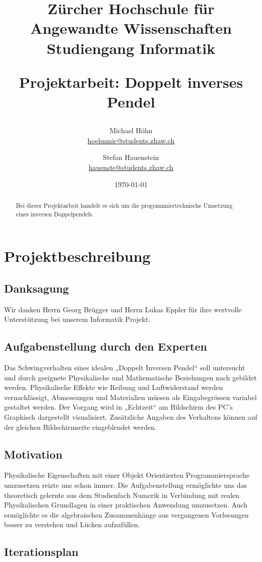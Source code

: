 \documentclass[12pt]{article}
\title{\vspace{-1cm}\linespread{1}\begin{flushleft}\normalsize{Zürcher Hochschule für Angewandte Wissenschaften\\Studiengang Informatik\\}\end{flushleft}\vspace{2cm}\Large{Projektarbeit: Doppelt inverses Pendel}\\\vspace{2cm}}
\author{Michael Höhn\\\href{mailto:hoehnmic@students.zhaw.ch}{hoehnmic@students.zhaw.ch} \and Stefan Hauenstein\\\href{mailto:hauenste@students.zhaw.ch}{hauenste@students.zhaw.ch}}
\date{\today}
\begin{document}
\maketitle\thispagestyle{empty}
\newpage

\begin{abstract}
Bei dieser Projektarbeit handelt es sich um die programmiertechnische Umsetzung eines inversen Doppelpendels.
\end{abstract}
\newpage

\tableofcontents
\newpage

\section{Projektbeschreibung}
\subsection{Danksagung}
Wir danken Herrn Georg Brügger und Herrn Lukas Eppler für ihre wertvolle Unterstützung bei unserem Informatik Projekt.

\subsection{Aufgabenstellung durch den Experten}
Das Schwingverhalten eines idealen „Doppelt Inversen Pendel“ soll untersucht und durch geeignete Physikalische und Mathematische Beziehungen nach gebildet werden. Physikalische Effekte wie Reibung und Luftwiderstand werden vernachlässigt, Abmessungen und Materialien müssen als Eingabegrössen variabel gestaltet werden.
Der Vorgang wird in „Echtzeit“ am Bildschirm des PC's Graphisch dargestellt visualisiert.
Zusätzliche Angaben des Verhaltens können auf der gleichen Bildschirmseite eingeblendet werden.

\subsection{Motivation}
Physikalische Eigenschaften mit einer Objekt Orientierten Programmiersprache umzusetzen reizte uns schon immer. Die  Aufgabenstellung ermöglichte uns das theoretisch gelernte aus dem Studienfach Numerik in Verbindung mit realen Physikalischen Grundlagen in einer praktischen Anwendung umzusetzen.
Auch ermöglichte es die algebraischen Zusammenhänge aus vergangenen Vorlesungen besser zu verstehen und Lücken aufzufüllen.

\subsection{Iterationsplan}
\end{document}

